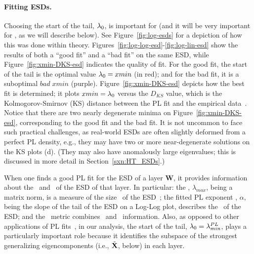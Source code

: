 
\paragraph{Fitting ESDs.}
Choosing the start of the tail, $\lambda_{0}$, is important for \HTSR (and it will be very important for \SETOL, as we will describe below).
See Figure~\ref{fig:log-esds} for a depiction of how this was done within \HTSR theory.
Figures~\ref{fig:log-log-esd}-\ref{fig:log-lin-esd} show the results of both a ``good fit'' and a ``bad fit'' on the same ESD,
while Figure~\ref{fig:xmin-DKS-esd} indicates the quality of fit.
For the good fit, the start of the tail is the optimal value $\lambda_{0}=xmin$ (in red); and for the bad fit, it is a suboptimal $bad\;xmin$ (purple).
Figure~\ref{fig:xmin-DKS-esd} depicts how the best fit is determined; it plots $xmin=\lambda_{0}$ versus the $D_{KS}$ 
value, which is the Kolmogorov-Smirnov (KS) distance between the PL fit and the empirical data~\cite{CSN09_powerlaw}.
Notice that there are two nearly degenerate minima on Figure~\ref{fig:xmin-DKS-esd}, corresponding to the good fit and the bad fit. 
It is not uncommon to face such practical challenges, as real-world ESDs are often slightly deformed from a perfect PL density, e.g.,
they may have two or more near-degenerate solutions on the KS plots (d).
(They may also have anomalously large eigenvalues; this is discussed in more detail in Section~\ref{sxn:HT_ESDs}.)

When one finds a good PL fit for the ESD of a layer $\mathbf{W}$,
it provides information about the \SHAPE~and \SCALE~of the ESD of that layer.
In particular: 
the \SPECTRALNORM, $\lambda_{max}$, being a matrix norm, is a measure of the size \SCALE~of the ESD~\cite{MM21a_simpsons_TR}; 
the fitted PL exponent \ALPHA, $\alpha$, being the slope of the tail of the ESD on a Log-Log plot, describes the \SHAPE~of the ESD; and
the \WW \ALPHAHAT~metric combines \SHAPE~and \SCALE~information.
Also, as opposed to other applications of PL fits~\cite{CSN09_powerlaw,BouchaudPotters03}, in our analysis,
the start of the tail, $\lambda_{0}=\lambda^{PL}_{min}$, plays a particularly important role because it
identifies the subspace of the strongest generalizing eigencomponents (i.e., $\tilde{\mathbf{X}}$, below) in each layer.

